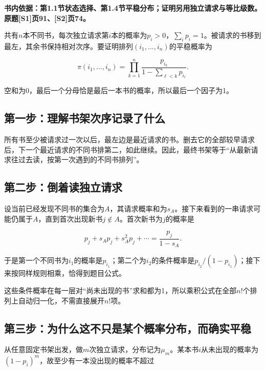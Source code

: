 \documentclass[
  11pt,a4paper,UTF8,fontset=fandol]{ctexart}
\begin{document}
\textbf{书内依据：第1.1节状态选择、第1.4节平稳分布；证明另用独立请求与等比级数。原题{[}S1{]}页91、{[}S2{]}页74。}

共有\(n\)本不同书，每次独立请求第\(i\)本的概率为\(p_i>0\)，\(\sum_ip_i=1\)。被请求的书移到最左，其余书保持相对次序。要证明排列\((i_1,\ldots,i_n)\)的平稳概率为

\[
\boxed{\pi(i_1,\ldots,i_n)=\prod_{k=1}^n\frac{p_{i_k}}{1-\sum_{\ell<k}p_{i_\ell}}.}
\]

空和为0，最后一个分母恰是最后一本书的概率，所以最后一个因子为1。

\subsection{第一步：理解书架次序记录了什么}\label{ux7b2cux4e00ux6b65ux7406ux89e3ux4e66ux67b6ux6b21ux5e8fux8bb0ux5f55ux4e86ux4ec0ux4e48}

所有书至少被请求过一次以后，最左边是最近请求的书。删去它的全部较早请求后，下一个最近请求的不同书排第二，如此继续。因此，最终书架等于``从最新请求往过去读，按第一次遇到的不同书排列''。

\subsection{第二步：倒着读独立请求}\label{ux7b2cux4e8cux6b65ux5012ux7740ux8bfbux72ecux7acbux8bf7ux6c42}

设当前已经发现不同书的集合为\(A\)，其请求概率和为\(s_A\)。接下来看到的一串请求可能仍属于\(A\)，直到首次出现新书\(j\notin A\)。首次新书为\(j\)的概率是

\[
p_j+s_Ap_j+s_A^2p_j+\cdots=\frac{p_j}{1-s_A}.
\]

于是第一个不同书为\(i_1\)的概率是\(p_{i_1}\)；第二个为\(i_2\)的条件概率是\(p_{i_2}/(1-p_{i_1})\)；接下来按同样规则相乘，恰得到题目公式。

这些条件概率在每一层对``尚未出现的书''求和都为1，所以乘积公式在全部\(n!\)个排列上自动归一化，不需直接展开\(n!\)项。

\subsection{第三步：为什么这不只是某个概率分布，而确实平稳}\label{ux7b2cux4e09ux6b65ux4e3aux4ec0ux4e48ux8fd9ux4e0dux53eaux662fux67d0ux4e2aux6982ux7387ux5206ux5e03ux800cux786eux5b9eux5e73ux7a33}

从任意固定书架出发，做\(m\)次独立请求，分布记为\(\mu_m\)。某本书\(i\)从未出现的概率为\((1-p_i)^m\)，故至少有一本没出现的概率不超过
\end{document}
